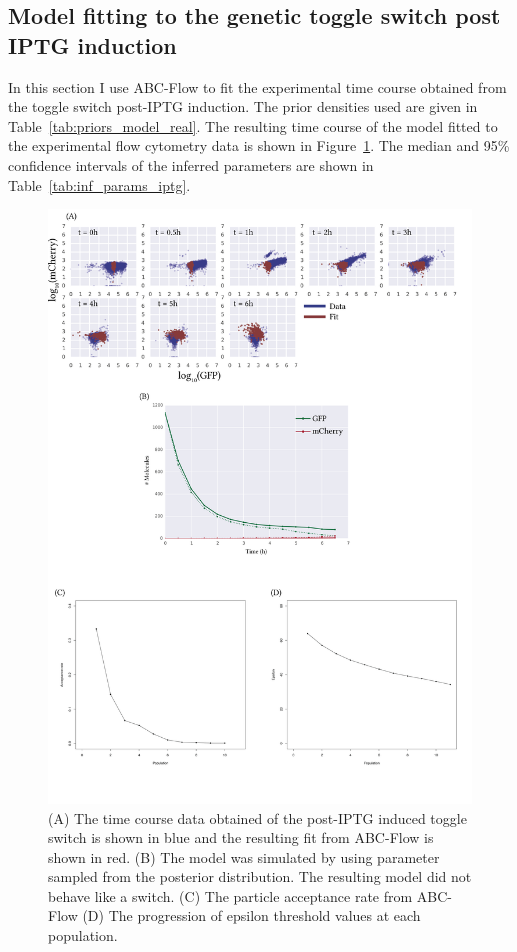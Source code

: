 \clearpage
\subsection{Model fitting to the genetic toggle switch post IPTG induction}
In this section I use ABC-Flow to fit the experimental time course obtained from the toggle switch post-IPTG induction. The prior densities used are given in Table~\ref{tab:priors_model_real}. The resulting time course of the model fitted to the experimental flow cytometry data is shown in Figure~\ref{fig:1d-real-res-iptg}. The median and 95\% confidence intervals of the inferred parameters are shown in Table~\ref{tab:inf_params_iptg}.


\begin{figure}[htbp]
\centerfloat%
	\includegraphics[width=1.2\textwidth]{../../chapters/chapterABCFlow/images/2D_real_res_IPTG-01.png}
	\caption[ABC-Flow fit to post-\acrshort{atc} time course data]{\label{fig:1d-real-res-iptg} (A) The time course data obtained of the post-IPTG induced toggle switch is shown in blue and the resulting fit from ABC-Flow is shown in red. (B) The model was simulated by using parameter sampled from the posterior distribution. The resulting model did not behave like a switch. (C) The particle acceptance rate from ABC-Flow (D) The progression of epsilon threshold values at each population.  }
\end{figure}

